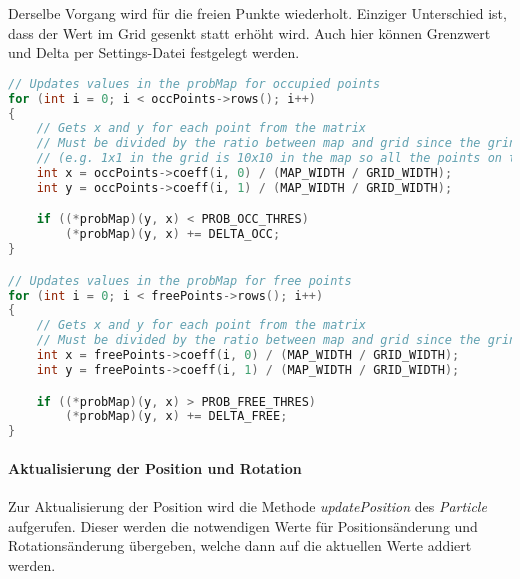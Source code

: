 Derselbe Vorgang wird für die freien Punkte wiederholt.
Einziger Unterschied ist, dass der Wert im Grid gesenkt statt erhöht wird.
Auch hier können Grenzwert und Delta per Settings-Datei festgelegt werden.

\begin{lstlisting}[caption={Auschnitt aus updateProbMap},label={lst:update-prob-map},language={C++}]
// Updates values in the probMap for occupied points
for (int i = 0; i < occPoints->rows(); i++)
{
    // Gets x and y for each point from the matrix
    // Must be divided by the ratio between map and grid since the grind is a fraction of the size to allow for some error
    // (e.g. 1x1 in the grid is 10x10 in the map so all the points on the map that lay in this 10x10 area will change the value of probability at that single point in the grid)
    int x = occPoints->coeff(i, 0) / (MAP_WIDTH / GRID_WIDTH);
    int y = occPoints->coeff(i, 1) / (MAP_WIDTH / GRID_WIDTH);

    if ((*probMap)(y, x) < PROB_OCC_THRES)
        (*probMap)(y, x) += DELTA_OCC;
}

// Updates values in the probMap for free points
for (int i = 0; i < freePoints->rows(); i++)
{
    // Gets x and y for each point from the matrix
    // Must be divided by the ratio between map and grid since the grind is a fraction of the size to allow for some error
    int x = freePoints->coeff(i, 0) / (MAP_WIDTH / GRID_WIDTH);
    int y = freePoints->coeff(i, 1) / (MAP_WIDTH / GRID_WIDTH);

    if ((*probMap)(y, x) > PROB_FREE_THRES)
        (*probMap)(y, x) += DELTA_FREE;
}
\end{lstlisting}

\paragraph{Aktualisierung der Position und Rotation}
\label{position_update}Zur Aktualisierung der Position wird die Methode \textit{updatePosition} des \textit{Particle} aufgerufen.
Dieser werden die notwendigen Werte für Positionsänderung und Rotationsänderung übergeben, welche dann auf die aktuellen Werte addiert werden.

